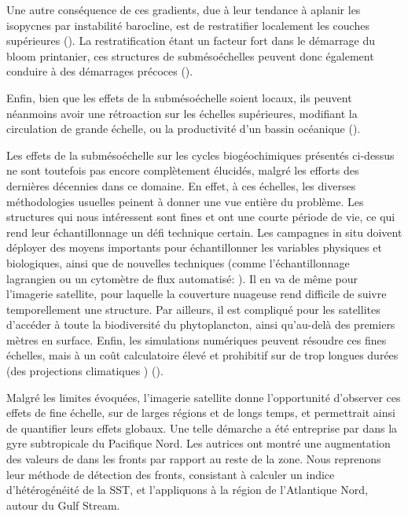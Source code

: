 Une autre conséquence de ces gradients, due à leur tendance à aplanir les isopycnes par instabilité barocline, est de restratifier localement les couches supérieures (\cite{fox-kemper_2008}).
La restratification étant un facteur fort dans le démarrage du bloom printanier, ces structures de submésoéchelles peuvent donc également conduire à des démarrages précoces (\cite{mahadevan_2020}).

Enfin, bien que les effets de la submésoéchelle soient locaux, ils peuvent néanmoins avoir une rétroaction sur les échelles supérieures, modifiant la circulation de grande échelle, ou la productivité d'un bassin océanique (\cite{levy_2012a,balwada_2022}).

Les effets de la submésoéchelle sur les cycles biogéochimiques présentés ci-dessus ne sont toutefois pas encore complètement élucidés, malgré les efforts des dernières décennies dans ce domaine.
En effet, à ces échelles, les diverses méthodologies usuelles peinent à donner une vue entière du problème.
Les structures qui nous intéressent sont fines et ont une courte période de vie, ce qui rend leur échantillonnage un défi technique certain.
Les campagnes in situ doivent déployer des moyens importants pour échantillonner les variables physiques et biologiques, ainsi que de nouvelles techniques (comme l'échantillonnage lagrangien ou un cytomètre de flux automatisé: \cite{thyssen_2015,marrec_2018,tzortzis_2021}).
Il en va de même pour l'imagerie satellite, pour laquelle la couverture nuageuse rend difficile de suivre temporellement une structure.
Par ailleurs, il est compliqué pour les satellites d'accéder à toute la biodiversité du phytoplancton, ainsi qu'au-delà des premiers mètres en surface.
Enfin, les simulations numériques peuvent résoudre ces fines échelles, mais à un coût calculatoire élevé et prohibitif sur de trop longues durées (des projections climatiques ) (\cite{fox-kemper_2019}).

Malgré les limites évoquées, l'imagerie satellite donne l'opportunité d'observer ces effets de fine échelle, sur de larges régions et de longs temps, et permettrait ainsi de quantifier leurs effets globaux.
Une telle démarche a été entreprise par \textcite{liu_2016} dans la gyre subtropicale du Pacifique Nord.
Les autrices  ont montré une augmentation des valeurs de  dans les fronts par rapport au reste de la zone.
Nous reprenons leur méthode de détection des fronts, consistant à calculer un indice d'hétérogénéité de la SST, et l'appliquons à la région de l'Atlantique Nord, autour du Gulf Stream.


